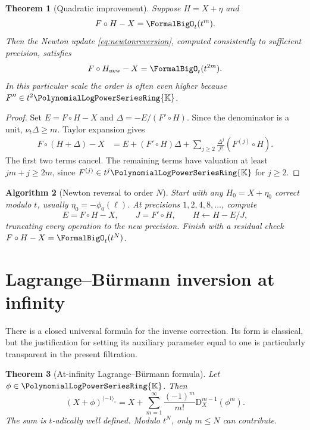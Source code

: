 \documentclass[11pt,oneside,openany]{book}
\newtheorem{theorem}{Theorem}[chapter]
\newtheorem{algorithm}[theorem]{Algorithm}
\newcommand{\K}{\mathbb{K}}
\newcommand{\Rring}{\PolynomialLogPowerSeriesRing{\K}}
\newcommand{\ordt}{\nu_t}
\newcommand{\compose}{\mathbin{\circ}}
\newcommand{\rev}{^{\langle-1\rangle_{\circ}}}
\newcommand{\D}{\mathrm{D}}
\begin{document}
\begin{theorem}[Quadratic improvement]\label{thm:newtonreverse}
Suppose \(H=X+\eta\) and
\[
 F\compose H-X=\FormalBigO_t(t^m).
\]
Then the Newton update \cref{eq:newtonreversion}, computed consistently to
sufficient precision, satisfies
\[
 F\compose H_{\mathrm{new}}-X=\FormalBigO_t(t^{2m}).
\]
In this particular scale the order is often even higher because
\(F''\in t^2\Rring\).
\end{theorem}

\begin{proof}
Set \(E=F\compose H-X\) and
\(\Delta=-E/(F'\compose H)\).  Since the denominator is a unit,
\(\ordt\Delta\geq m\).  Taylor expansion gives
\begin{align*}
 F\compose(H+\Delta)-X
 &=E+(F'\compose H)\Delta
   +\sum_{j\geq2}\frac{\Delta^j}{j!}(F^{(j)}\compose H).
\end{align*}
The first two terms cancel.  The remaining terms have valuation at least
\(jm+j\geq2m\), since \(F^{(j)}\in t^j\Rring\) for \(j\geq2\).
\end{proof}

\begin{algorithm}[Newton reversal to order \(N\)]\label{alg:newtonreverse}
Start with any \(H_0=X+\eta_0\) correct modulo \(t\), usually
\(\eta_0=-\phi_0(\ell)\).  At precisions \(1,2,4,8,\ldots\), compute
\[
 E=F\compose H-X,
 \qquad
 J=F'\compose H,
 \qquad
 H\leftarrow H-E/J,
\]
truncating every operation to the new precision.  Finish with a residual check
\(F\compose H-X=\FormalBigO_t(t^N)\).
\end{algorithm}

\section{Lagrange--Bürmann inversion at infinity}
There is a closed universal formula for the inverse correction.  Its form is
classical, but the justification for setting its auxiliary parameter equal to
one is particularly transparent in the present filtration.

\begin{theorem}[At-infinity Lagrange--Bürmann formula]
\label{thm:lagrangeinfinity}
Let \(\phi\in\Rring\).  Then
\begin{equation}\label{eq:lagrangeinfinity}
 (X+\phi)\rev
 =X+\sum_{m=1}^{\infty}
   \frac{(-1)^m}{m!}\D_X^{m-1}\!\left(\phi^m\right).
\end{equation}
The sum is \(t\)-adically well defined.  Modulo \(t^N\), only
\(m\leq N\) can contribute.
\end{theorem}
\end{document}
